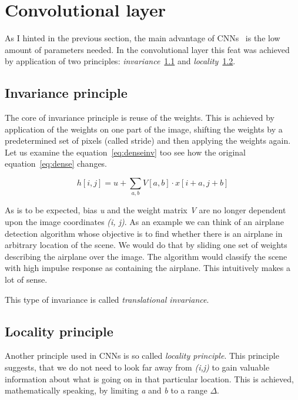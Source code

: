 \section{Convolutional layer}\label{sec:convolutional}
As I hinted in the previous section, the main advantage of CNNs~\cite{ConvLayer} is the low amount of parameters needed.
In the convolutional layer this feat was achieved by application of two principles:
\textit{invariance}~\ref{subsec:invariance} and \textit{locality}~\ref{subsec:locality}.

\subsection{Invariance principle}\label{subsec:invariance}
The core of invariance principle is reuse of the weights.
This is achieved by application of the weights on one part of the image, shifting the weights by a predetermined set
of pixels (called stride) and then applying the weights again.
Let us examine the equation~\ref{eq:denseinv} too see how the original equation~\ref{eq:dense} changes.

\begin{equation}
    \label{eq:denseinv}
    h[i, j] = u + \sum_{a,b} V[a,b] \cdot x[i+a,j+b]
\end{equation}

As is to be expected, bias \textit{u} and the weight matrix \textit{V} are no longer dependent upon the image
coordinates \textit{(i, j)}.
As an example we can think of an airplane detection algorithm whose objective is to find whether there is an airplane
in arbitrary location of the scene.
We would do that by sliding one set of weights describing the airplane over the image.
The algorithm would classify the scene with high impulse response as containing the airplane.
This intuitively makes a lot of sense.

This type of invariance is called \textit{translational invariance}.

\subsection{Locality principle}\label{subsec:locality}
Another principle used in CNNs is so called \textit{locality principle}.
This principle suggests, that we do not need to look far away from \textit{(i,j)} to gain valuable information about
what is going on in that particular location.
This is achieved, mathematically speaking, by limiting \textit{a} and \textit{b} to a range $\Delta$.

